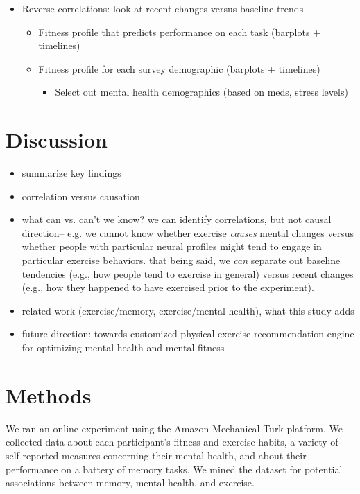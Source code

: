 \documentclass[10pt]{article}
\begin{document}
\begin{itemize}
\begin{itemize}
      \end{itemize}
    \item Reverse correlations: look at recent changes versus baseline trends
      \begin{itemize}
      \item Fitness profile that predicts performance on each task (barplots + timelines)
      \item Fitness profile for each survey demographic (barplots + timelines)
        \begin{itemize}
          \item Select out mental health demographics (based on meds, stress levels)
          \end{itemize}
        \end{itemize}
  \end{itemize}

  \section*{Discussion}
  \begin{itemize}
  \item summarize key findings
  \item correlation versus causation
         \item what can vs. can't we know?  we can identify correlations, but not causal direction-- e.g. we cannot know whether exercise \textit{causes} mental changes versus whether people with particular neural profiles might tend to engage in particular exercise behaviors.  that being said, we \textit{can} separate out baseline tendencies (e.g., how people tend to exercise in general) versus recent changes (e.g., how they happened to have exercised prior to the experiment).
  \item related work (exercise/memory, exercise/mental health), what this study adds
    \item future direction: towards customized physical exercise recommendation engine for optimizing mental health and mental fitness
    \end{itemize}

    \section*{Methods}

    We ran an online experiment using the Amazon Mechanical Turk
    platform.  We collected data about each participant's fitness and
    exercise habits, a variety of self-reported measures concerning their
    mental health, and about their performance on a battery of memory
    tasks.  We mined the dataset for potential associations between
    memory, mental health, and exercise.
\end{document}
